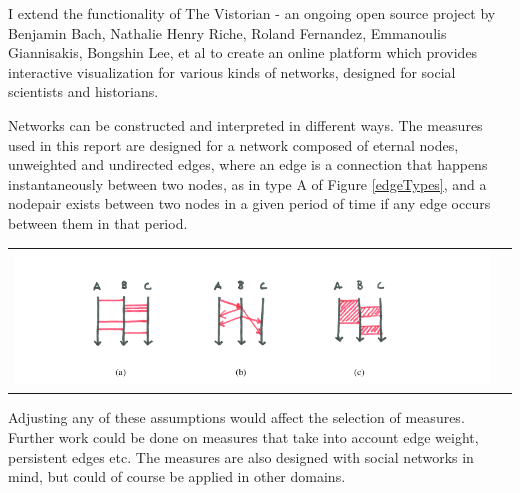 I extend the functionality of The Vistorian \cite{bach:hal-01205822} - an ongoing open source project by Benjamin Bach, Nathalie Henry Riche, Roland Fernandez, Emmanoulis Giannisakis, Bongshin Lee, et al to create an online platform which provides interactive visualization for various kinds of networks, designed for social scientists and historians. 

Networks can be constructed and interpreted in different ways. The measures used in this report are designed for a network composed of eternal nodes, unweighted and undirected edges, where an edge is a connection that happens instantaneously between two nodes, as in type A of Figure \ref{edgeTypes}, and a nodepair exists between two nodes in a given period of time if any edge occurs between them in that period. 

\begin{center}
\begin{tabular}{cc}
\label{edgeTypes}
\includegraphics[trim={0 0 0 0}, width=140mm]{./Figures/edgeTypes.png}
\end{tabular}
\end{center}


Adjusting any of these assumptions would affect the selection of measures. Further work could be done on measures that take into account edge weight, persistent edges etc. The measures are also designed with social networks in mind, but could of course be applied in other domains.



